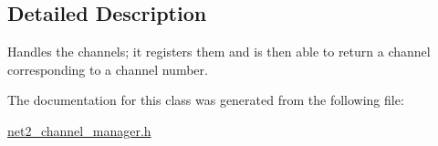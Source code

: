 \subsection{Detailed Description}
Handles the channels; it registers them and is then able to return a channel corresponding to a channel number. 

The documentation for this class was generated from the following file\-:\begin{DoxyCompactItemize}
\item 
\hyperlink{net2__channel__manager_8h}{net2\-\_\-channel\-\_\-manager.\-h}\end{DoxyCompactItemize}

